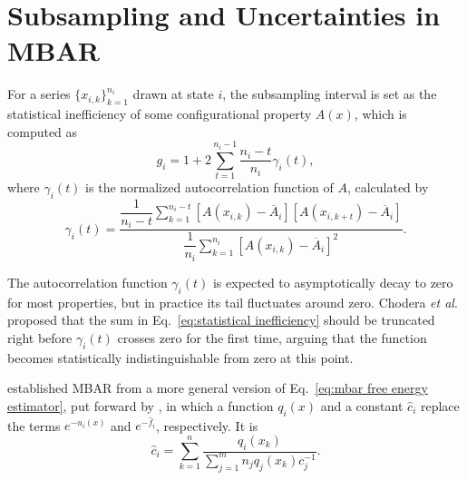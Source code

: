 \documentclass[journal=jctcce,manuscript=article,layout=twocolumn]{achemso}
\newcommand{\avg}[1]{\overline{#1}}             %
\begin{document}
\appendix

\section{Subsampling and Uncertainties in MBAR}
\label{sec:subsampling and uncertainty in MBAR}

For a series $\{x_{i,k}\}_{k=1}^{n_i}$ drawn at state $i$, the subsampling interval is set as the statistical inefficiency of some configurational property $A(x)$, which is computed as\cite{Chodera_2007}
\begin{equation}
\label{eq:statistical inefficiency}
g_i = 1 + 2 \sum\limits_{t=1}^{n_i-1} \frac{n_i - t}{n_i} \gamma_i(t),
\end{equation}
where $\gamma_i(t)$ is the normalized autocorrelation function of $A$, calculated by
\begin{equation*}
\gamma_i(t) = \frac{\dfrac{1}{n_i - t} \sum\limits_{k=1}^{n_i-t} \left[A(x_{i,k}) - \avg A_i\right]\left[A(x_{i,k+t}) - \avg A_i\right]}{\dfrac{1}{n_i} \sum\limits_{k=1}^{n_i} \left[A(x_{i,k}) - \avg A_i\right]^2}.
\end{equation*}

The autocorrelation function $\gamma_i(t)$ is expected to asymptotically decay to zero for most properties, but in practice its tail fluctuates around zero. Chodera \textit{et al}.\cite{Chodera_2007} proposed that the sum in Eq.~\eqref{eq:statistical inefficiency} should be truncated right before $\gamma_i(t)$ crosses zero for the first time, arguing that the function becomes statistically indistinguishable from zero at this point.

\citeauthor{Shirts_2008} \cite{Shirts_2008} established MBAR from a more general version of Eq.~\eqref{eq:mbar free energy estimator}, put forward by \citeauthor{Kong_2003} \cite{Kong_2003}, in which a function $q_i(x)$ and a constant $\hat c_i$ replace the terms $e^{-u_i(x)}$ and $e^{-\hat f_i}$, respectively. It is
\begin{equation}
\label{eq:mbar general estimator}
{\hat c}_i = \sum_{k=1}^n \frac{q_i(x_k)}{\sum_{j=1}^m n_j q_j(x_k) c_j^{-1}}.
\end{equation}
\end{document}
